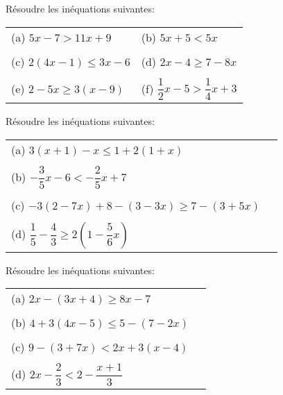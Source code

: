 \begin{exercice}
Résoudre les inéquations suivantes:\\

\renewcommand{\arraystretch}{0.8}
\begin{tabular}{p{4cm}p{4cm}}
(a) $5x-7 > 11x+9$ & (b) $5x+5<5x$\\
&\\
(c) $2(4x-1)\leq 3x-6$ & (d) $2x-4 \geq 7-8x$\\
&\\
(e) $2-5x\geq 3(x-9)$ & (f) $\dfrac{1}{2}x-5>\dfrac{1}{4}x+3$\\
\end{tabular}
\end{exercice}

\begin{exercice}
Résoudre les inéquations suivantes:\\

\renewcommand{\arraystretch}{0.8}
\begin{tabular}{p{6cm}p{1cm}}
(a) $3(x+1)-x\leq1+2(1+x)$\\
&\\
(b) $-\dfrac{3}{5}x-6 < - \dfrac{2}{5}x+7$\\
&\\
(c) $-3(2-7x)+8-(3-3x)\geq 7-(3+5x)$\\
&\\
(d) $\dfrac{1}{5}-\dfrac{4}{3}\geq2\left( 1-\dfrac{5}{6}x\right) $\\

\end{tabular}
\end{exercice}

\begin{exercice}
Résoudre les inéquations suivantes:\\

\renewcommand{\arraystretch}{0.8}
\begin{tabular}{p{6cm}p{1cm}}
(a) $2x-(3x+4)\geq8x-7$\\
&\\
(b) $4+3(4x-5)\leq5-(7-2x)$\\
&\\
(c) $9-(3+7x)<2x+3(x-4)$\\
&\\
(d) $2x-\dfrac{2}{3}<2-\dfrac{x+1}{3}$\\

\end{tabular}
\end{exercice}

